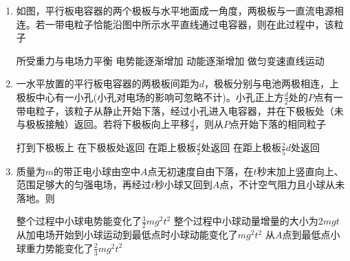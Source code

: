 
\begin{enumerate}[leftmargin=0em]
\renewcommand{\labelenumi}{\arabic{enumi}.}
\item
{}
如图，平行板电容器的两个极板与水平地面成一角度，两极板与一直流电源相连。若一带电粒子恰能沿图中所示水平直线通过电容器，则在此过程中，该粒子  

\begin{minipage}[h!]{0.6\linewidth}
\vspace{0.3em}
\fourchoices
{所受重力与电场力平衡}
{电势能逐渐增加}
{动能逐渐增加}
{做匀变速直线运动}
\vspace{0.3em}
\end{minipage}
\hfill
\begin{minipage}[h!]{0.3\linewidth}
\flushright
\vspace{0.3em}

\vspace{0.3em}
\end{minipage}




\item
{}
一水平放置的平行板电容器的两极板间距为$ d $，极板分别与电池两极相连，上极板中心有一小孔(小孔对电场的影响可忽略不计)。小孔正上方$ \frac{d}{2} $处的$ P $点有一带电粒子，该粒子从静止开始下落，经过小孔进入电容器，并在下极板处（未与极板接触）返回。若将下极板向上平移$ \frac{d}{3} $，则从$ P $点开始下落的相同粒子  



\fourchoices
{打到下极板上}
{在下极板处返回}
{在距上极板$ \frac{d}{2} $处返回}
{在距上极板$ \frac{2}{5}d $处返回}




\item
{}
质量为$ m $的带正电小球由空中$ A $点无初速度自由下落，在$ t $秒末加上竖直向上、范围足够大的匀强电场，再经过$ t $秒小球又回到$ A $点，不计空气阻力且小球从未落地。则  


\fourchoices
{整个过程中小球电势能变化了$\frac { 3 } { 2 } m g ^ { 2 } t ^ { 2 }$}
{整个过程中小球动量增量的大小为$ 2mgt $}
{从加电场开始到小球运动到最低点时小球动能变化了$ mg^{2}t^{2} $}
{从$ A $点到最低点小球重力势能变化了$\frac { 2 } { 3 } m g ^ { 2 } t ^ { 2 }$}





\end{enumerate}
